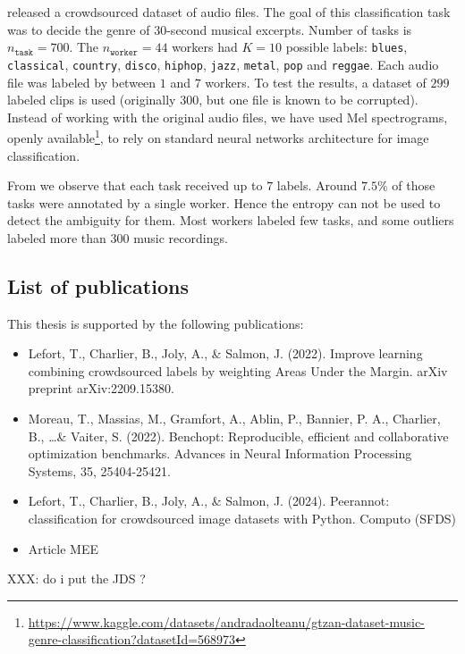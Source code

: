 \citet{rodrigues2014gaussian} released a crowdsourced dataset of audio files.
The goal of this classification task was to decide the genre of $ 30$-second musical excerpts. Number of tasks is $n_{\texttt{task}}=700$.
The $n_{\texttt{worker}}=44$ workers had $K=10$ possible labels: \texttt{blues}, \texttt{classical}, \texttt{country}, \texttt{disco}, \texttt{hiphop}, \texttt{jazz}, \texttt{metal}, \texttt{pop} and \texttt{reggae}.
Each audio file was labeled by between $1$ and $7$ workers.
To test the results, a dataset of $299$ labeled clips is used (originally $300$, but one file is known to be corrupted).
Instead of working with the original audio files, we have used Mel spectrograms, openly available\footnote{ \scriptsize \url{https://www.kaggle.com/datasets/andradaolteanu/gtzan-dataset-music-genre-classification?datasetId=568973}}, to rely on standard neural networks architecture for image classification.

From  we observe that each task received up to $7$ labels. Around $7.5\%$ of those tasks were annotated by a single worker. Hence the entropy can not be used to detect the ambiguity for them.
Most workers labeled few tasks, and some outliers labeled more than $300$ music recordings.

\subsection{List of publications}

This thesis is supported by the following publications:
\begin{itemize}
    \item Lefort, T., Charlier, B., Joly, A., \& Salmon, J. (2022). Improve learning combining crowdsourced labels by weighting Areas Under the Margin. arXiv preprint arXiv:2209.15380.
    \item Moreau, T., Massias, M., Gramfort, A., Ablin, P., Bannier, P. A., Charlier, B., \dots \& Vaiter, S. (2022). Benchopt: Reproducible, efficient and collaborative optimization benchmarks. Advances in Neural Information Processing Systems, 35, 25404-25421.
    \item Lefort, T., Charlier, B., Joly, A., \& Salmon, J. (2024). Peerannot: classification for crowdsourced image datasets with Python. Computo (SFDS)
    \item Article MEE
\end{itemize}

XXX: do i put the JDS ?
